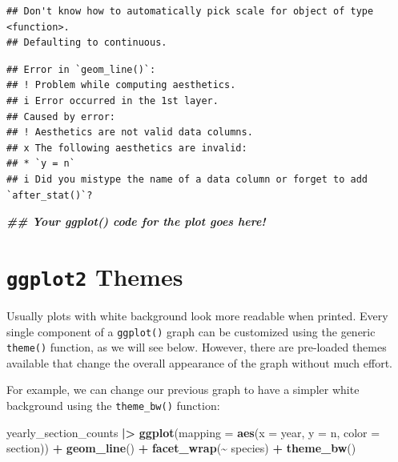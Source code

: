 \documentclass[
  10pt,
  letterpaper,
  twoside,
  openright]{book}
\newenvironment{Shaded}{\begin{snugshade}}{\end{snugshade}}
\newcommand{\AttributeTok}[1]{\textcolor[rgb]{0.13,0.29,0.53}{#1}}
\newcommand{\DocumentationTok}[1]{\textcolor[rgb]{0.56,0.35,0.01}{\textbf{\textit{#1}}}}
\newcommand{\FunctionTok}[1]{\textcolor[rgb]{0.13,0.29,0.53}{\textbf{#1}}}
\newcommand{\NormalTok}[1]{#1}
\newcommand{\SpecialCharTok}[1]{\textcolor[rgb]{0.81,0.36,0.00}{\textbf{#1}}}
\begin{document}
\begin{verbatim}
## Don't know how to automatically pick scale for object of type <function>.
## Defaulting to continuous.
\end{verbatim}

\begin{verbatim}
## Error in `geom_line()`:
## ! Problem while computing aesthetics.
## i Error occurred in the 1st layer.
## Caused by error:
## ! Aesthetics are not valid data columns.
## x The following aesthetics are invalid:
## * `y = n`
## i Did you mistype the name of a data column or forget to add `after_stat()`?
\end{verbatim}

\begin{Shaded}
\begin{Highlighting}[]
\DocumentationTok{\#\# Your ggplot() code for the plot goes here!}
\end{Highlighting}
\end{Shaded}

\hypertarget{ggplot2-themes}{%
\section{\texorpdfstring{\textbf{\texttt{ggplot2}}
Themes}{ggplot2 Themes}}\label{ggplot2-themes}}

Usually plots with white background look more readable when printed.
Every single component of a \texttt{ggplot()} graph can be customized
using the generic \texttt{theme()} function, as we will see below.
However, there are pre-loaded themes available that change the overall
appearance of the graph without much effort.

For example, we can change our previous graph to have a simpler white
background using the \texttt{theme\_bw()} function:

\begin{Shaded}
\begin{Highlighting}[]
\NormalTok{yearly\_section\_counts }\SpecialCharTok{|\textgreater{}}
 \FunctionTok{ggplot}\NormalTok{(}\AttributeTok{mapping =} \FunctionTok{aes}\NormalTok{(}\AttributeTok{x =}\NormalTok{ year, }\AttributeTok{y =}\NormalTok{ n, }\AttributeTok{color =}\NormalTok{ section)) }\SpecialCharTok{+}
     \FunctionTok{geom\_line}\NormalTok{() }\SpecialCharTok{+}
     \FunctionTok{facet\_wrap}\NormalTok{(}\SpecialCharTok{\textasciitilde{}}\NormalTok{ species) }\SpecialCharTok{+}
     \FunctionTok{theme\_bw}\NormalTok{()}
\end{Highlighting}
\end{Shaded}
\end{document}
